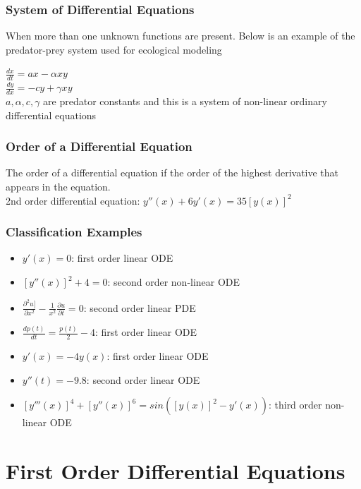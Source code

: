\documentclass{article}
\begin{document}
\subsubsection{System of Differential Equations}
When more than one unknown functions are present. Below is an example of the predator-prey system used for ecological modeling
\begin{center}
    $\frac{dx}{dt}=ax-\alpha xy$\\
    $\frac{dy}{dx}=-cy+\gamma xy$\\
    $a,\alpha, c, \gamma$ are predator constants and this is a system of non-linear ordinary differential equations
\end{center}
\subsubsection{Order of a Differential Equation}
The order of a differential equation if the order of the highest derivative that appears in the equation.\\
2nd order differential equation: $y''(x)+6y'(x)=35[y(x)]^2$
\subsubsection{Classification Examples}
\begin{itemize}
    \item $y'(x)=0$: first order linear ODE
    \item $[y''(x)]^2+4=0$: second order non-linear ODE
    \item $\frac{\partial^2u]}{\partial x^2}-\frac{1}{x^2}\frac{\partial u}{\partial t}=0$: second order linear PDE
    \item $\frac{dp(t)}{dt}=\frac{p(t)}{2}-4$: first order linear ODE
    \item $y'(x)=-4y(x)$: first order linear ODE
    \item $y''(t)=-9.8$: second order linear ODE
    \item $[y'''(x)]^4+[y''(x)]^6=sin([y(x)]^2-y'(x))$: third order non-linear ODE
\end{itemize}
\section{First Order Differential Equations}
\label{sec:first}
\end{document}
